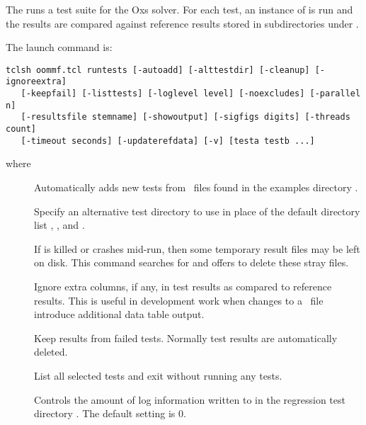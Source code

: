 The  runs a test suite for the Oxs solver.  For
each test, an instance of
is run and the results are compared against reference results stored
in subdirectories under .

The  launch command is:
\begin{verbatim}
tclsh oommf.tcl runtests [-autoadd] [-alttestdir] [-cleanup] [-ignoreextra]
   [-keepfail] [-listtests] [-loglevel level] [-noexcludes] [-parallel n]
   [-resultsfile stemname] [-showoutput] [-sigfigs digits] [-threads count]
   [-timeout seconds] [-updaterefdata] [-v] [testa testb ...]
\end{verbatim}
where
\begin{description}
\item[]
 Automatically adds new tests from \MIF\ files found in the examples
 directory .
\item[]
\begin{flushleft}
Specify an alternative test directory to use in place of the default
directory list ,
, and
.
\end{flushleft}
\item[]
If  is killed or crashes mid-run, then some temporary
result files may be left on disk. This command searches for and offers to
delete these stray files.
\item[]
 Ignore extra columns, if any, in test results as compared to
 reference results.  This is useful in development work when
 changes to a \MIF\ file introduce additional data table output.
\item[]
  Keep results from failed tests.  Normally test results are
  automatically deleted.
\item[]
  List all selected tests and exit without running any tests.
\item[]
  Controls the amount of log information written to
   in the regression test directory
  .  The default setting is 0.

\end{description}
